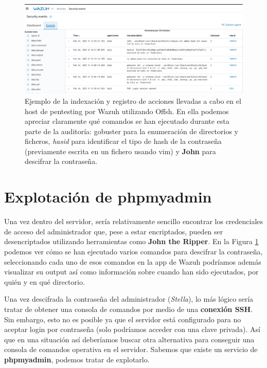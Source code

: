 \begin{figure}[!hbt]
  \centering
  \includegraphics[width=\textwidth]{imagenes/wazuh1.png}
  \caption{Ejemplo de la indexación y registro de acciones llevadas a cabo en el host de pentesting por Wazuh utilizando Offsh. En ella podemos apreciar claramente qué comandos se han ejecutado durante esta parte de la auditoría: gobuster para la enumeración de directorios y ficheros, \textit{hasid} para identificar el tipo de hash de la contraseña (previamente escrita en un fichero usando vim) y \textbf{John} para descifrar la contraseña.}
   \label{wazuh_john}
\end{figure}

\section{Explotación de phpmyadmin}

Una vez dentro del servidor, sería relativamente sencillo encontrar los credenciales de acceso del administrador que, pese a estar encriptados, pueden ser desencriptados utilizando herramientas como \textbf{John the Ripper}. En la Figura \ref{wazuh_john} podemos ver cómo se han ejecutado varios comandos para descifrar la contraseña, seleccionando cada uno de esos comandos en la app de Wazuh podríamos además visualizar su output así como información sobre cuando han sido ejecutados, por quién y en qué directorio.

Una vez descifrada la contraseña del administrador (\textit{Stella}), lo más lógico sería tratar de obtener una consola de comandos por medio de una \textbf{conexión SSH}. Sin embargo, esto no es posible ya que el servidor está configurado para no aceptar login por contraseña (solo podríamos acceder con una clave privada). Así que en una situación así deberíamos buscar otra alternativa para conseguir una consola de comandos operativa en el servidor. Sabemos que existe un servicio de \textbf{phpmyadmin}, podemos tratar de explotarlo.


